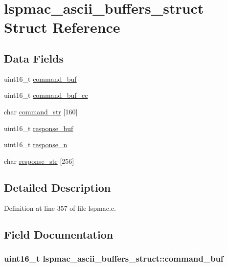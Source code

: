 \hypertarget{structlspmac__ascii__buffers__struct}{\section{lspmac\-\_\-ascii\-\_\-buffers\-\_\-struct Struct Reference}
\label{structlspmac__ascii__buffers__struct}
}
\subsection*{Data Fields}
\begin{DoxyCompactItemize}
\item 
uint16\-\_\-t \hyperlink{structlspmac__ascii__buffers__struct_ad92fe7e16e5e67ec4c115a6b86890faa}{command\-\_\-buf}
\item 
uint16\-\_\-t \hyperlink{structlspmac__ascii__buffers__struct_a4d11efeb1eef407d811d3f9b774adc54}{command\-\_\-buf\-\_\-cc}
\item 
char \hyperlink{structlspmac__ascii__buffers__struct_abe6a433dd9be4781dbf7e31d16484a4b}{command\-\_\-str} \mbox{[}160\mbox{]}
\item 
uint16\-\_\-t \hyperlink{structlspmac__ascii__buffers__struct_ae1d37cf9568478c9d8dad540ce77183c}{response\-\_\-buf}
\item 
uint16\-\_\-t \hyperlink{structlspmac__ascii__buffers__struct_a97c2fdd21eec29c2cba993e361c3c069}{response\-\_\-n}
\item 
char \hyperlink{structlspmac__ascii__buffers__struct_a32c4baecf20143eb71d348b6b5679039}{response\-\_\-str} \mbox{[}256\mbox{]}
\end{DoxyCompactItemize}


\subsection{Detailed Description}


Definition at line 357 of file lspmac.\-c.



\subsection{Field Documentation}
\hypertarget{structlspmac__ascii__buffers__struct_ad92fe7e16e5e67ec4c115a6b86890faa}{
\subsubsection[{command\-\_\-buf}]{\setlength{\rightskip}{0pt plus 5cm}uint16\-\_\-t lspmac\-\_\-ascii\-\_\-buffers\-\_\-struct\-::command\-\_\-buf}}\label{structlspmac__ascii__buffers__struct_ad92fe7e16e5e67ec4c115a6b86890faa}


